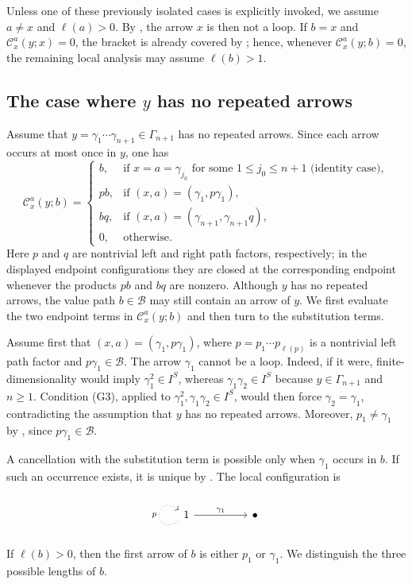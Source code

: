 \documentclass[11pt,a4paper,reqno]{amsart}
\newcommand{\mB}{\mathcal B}
\newcommand{\mC}{\mathcal C}
\newcommand{\para}[2]{(#1,#2)}
\newcommand{\gj}{\gamma_{j_0}}
\theoremstyle{plain}
\theoremstyle{definition}
\numberwithin{equation}{section}
\begin{document}
	Unless one of these previously isolated cases is explicitly invoked, we assume
	$a\neq x$ and $\ell(a)>0$.  By , the arrow $x$ is then not a
	loop.  If $b=x$ and $\mC_x^a(y;x)=0$, the bracket is already covered by
	; hence, whenever $\mC_x^a(y;b)=0$, the remaining local
	analysis may assume $\ell(b)>1$.
	\subsection{The case where \texorpdfstring{$y$}{y} has no repeated arrows}\label{subsec:mixed-no-repetition}
	
	Assume that
	$y=\gamma_1\cdots\gamma_{n+1}\in\Gamma_{n+1}$
	has no repeated arrows.  Since each arrow occurs at most once in $y$, one has
	\[
	\mC_x^a(y;b)=
	\begin{cases}
		b, & \text{if } x=a=\gj\text{ for some }1\leq j_0\leq n+1
		\text{ (identity case)},\\
		pb, & \text{if }\para{x}{a}=\para{\gamma_1}{p\gamma_1},\\
		bq, & \text{if }\para{x}{a}=\para{\gamma_{n+1}}{\gamma_{n+1}q},\\
		0, & \text{otherwise.}
	\end{cases}
	\]
	Here $p$ and $q$ are nontrivial left and right path factors, respectively;
	in the displayed endpoint configurations they are closed at the corresponding
	endpoint whenever the products $pb$ and $bq$ are nonzero.  Although $y$ has no
	repeated arrows, the value path $b\in\mB$ may still contain an arrow of $y$.
	We first evaluate the two endpoint terms in $\mC_x^a(y;b)$ and then turn to
	the substitution terms.
	
	Assume first that
	$\para{x}{a}=\para{\gamma_1}{p\gamma_1}$,
	where $p=p_1\cdots p_{\ell(p)}$ is a nontrivial left path factor and
	$p\gamma_1\in\mB$.  The arrow $\gamma_1$ cannot be a loop.  Indeed, if it
	were, finite-dimensionality would imply $\gamma_1^2\in I^S$, whereas
	$\gamma_1\gamma_2\in I^S$ because $y\in\Gamma_{n+1}$ and $n\geq1$.
	Condition \textup{(G3)}, applied to
	$\gamma_1^2,\gamma_1\gamma_2\in I^S$, would then force
	$\gamma_2=\gamma_1$, contradicting the assumption that $y$ has no repeated arrows.  Moreover,
	$p_1\neq\gamma_1$ by , since $p\gamma_1\in\mB$.
	
	A cancellation with the substitution term is possible only when $\gamma_1$
	occurs in $b$.  If such an occurrence exists, it is unique by
	.  The local configuration is
	\[
	\begin{tikzcd}
		1 && \bullet
		\arrow["p", dotted, from=1-1, to=1-1, loop, in=145, out=215, distance=10mm]
		\arrow["{\gamma_1}", from=1-1, to=1-3]
	\end{tikzcd}
	\]
	If $\ell(b)>0$, then the first arrow of $b$ is either $p_1$ or $\gamma_1$.
	We distinguish the three possible lengths of $b$.
	
\end{document}
